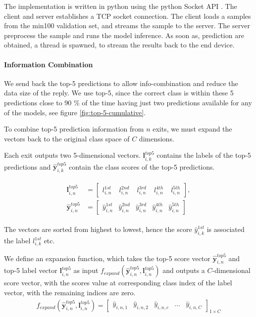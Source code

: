 The implementation is written in \gls{python} using the \gls{python} Socket API \cite{noauthor_socket_nodate}. The client and server establishes a TCP socket connection. The client loads a samples from the \gls{min100} validation set, and streams the sample to the server. The server preprocess the sample and runs the model inference. As soon as, prediction are obtained, a thread is spawned, to stream the results back to the end device. 

\paragraph{Information Combination}

We send back the top-5 predictions to allow info-combination and reduce the data size of the reply. We use top-5, since the correct class is within these 5 predictions close to 90 \% of the time having just two predictions available for any of the models, see figure \ref{fig:top-5-cumulative}.

To combine top-5 prediction information from $ n $ exits, we must expand the vectors back to the original class space of $ C $ dimensions.

Each exit outputs two 5-dimensional vectors. $\mathbf{l}_{i,k}^{top5}$ contains the labels of the top-5 predictions and $ \mathbf{\hat{y}}_{i,k}^{top5}$ contain the class scores of the top-5 predictions. 

\begin{align}
\begin{split}
\mathbf{l}_{i,n}^{top5} &= \begin{bmatrix}
l_{i,n}^{1st} & \phantom{.}l_{i,n}^{2nd} & \phantom{.}l_{i,n}^{3rd} & \phantom{.}l_{i,n}^{4th} & \phantom{.}l_{i,n}^{5th}
\end{bmatrix}, \\
\mathbf{\hat{y}}^{top5}_{i,n} &= \begin{bmatrix}
\hat{y}_{i,n}^{1st} & \hat{y}_{i,n}^{2nd} & \hat{y}_{i,n}^{3rd} & \hat{y}_{i,n}^{4th} & \hat{y}_{i,n}^{5th}
\end{bmatrix}
\end{split}
\end{align}

The vectors are sorted from highest to lowest, hence the score $ \hat{y}_{i,k}^{1st} $ is associated the label $ l_{i,k}^{1st} $ etc. 

We define an expansion function, which takes the top-5 score vector $ \mathbf{\hat{y}}_{i,n}^{top5}$ and top-5 label vector  $\mathbf{l}_{i,n}^{top5}$ as input  $ f_{expand}\left(\bm{\hat{y}}_{i,n}^{top5},\mathbf{l}_{i,n}^{top5}\right) $ and outputs a $ C $-dimensional score vector, with the scores value at corresponding class index of the label vector, with the remaining indices are zero.
\begin{align}
f_{expand}\left(\bm{\hat{y}}_{i,n}^{top5},\mathbf{l}_{i,n}^{top5}\right) = 
\begin{bmatrix}
\hat{y}_{i,n,1} & \hat{y}_{i,n,2} & \hat{y}_{i,n,c} & \dots & \hat{y}_{i,n,C}
\end{bmatrix}_{1 \times C}
\end{align}

